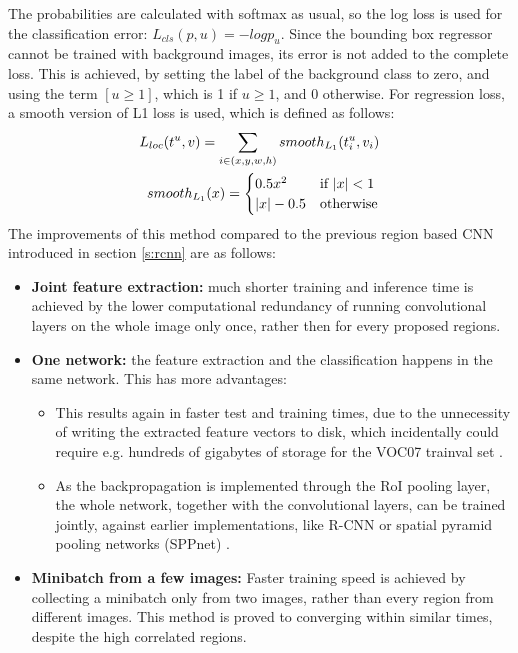 The probabilities are calculated with softmax as usual, so the log loss is used for the classification error: $L_{cls}(p,u) = -logp_u$. Since the bounding box regressor cannot be trained with background images, its error is not added to the complete loss. This is achieved, by setting the label of the background class to zero, and using the term $[u \ge 1]$, which is 1 if $u \ge 1$, and 0 otherwise. For regression loss, a smooth version of L1 loss is used, which is defined as follows:
\bigbreak
\begin{align}\label{eq:smoothl1loss}
	L_{loc}(t^u, v) = \sum\limits_{i \in (x, y, w, h)} smooth_{L_{1}} (t_{i}^u, v_i)\\
	smooth_{L_{1}} (x) = \begin{cases}
               0.5 x^2 & \text{if } \lvert x\rvert < 1\\
               \lvert x\rvert-0.5 & \text{otherwise}
            \end{cases}
\end{align}
\bigbreak
The improvements of this method compared to the previous region based CNN introduced in section \ref{s:rcnn} are as follows:
\begin{itemize}
	\item\textbf{Joint feature extraction:} much shorter training and inference time is achieved by the lower computational redundancy of running convolutional layers on the whole image only once, rather then for every proposed regions.
	\item\textbf{One network:} the feature extraction and the classification happens in the same network. This has more advantages:
	\begin{itemize}
	        \item This results again in faster test and training times, due to the unnecessity of writing the extracted feature vectors to disk, which incidentally could require e.g. hundreds of gigabytes of storage \cite{Girshick:2016:RCN:2881668.2882239} for the VOC07 trainval set \cite{pascal-voc-2007}.
	        \item As the backpropagation is implemented through the RoI pooling layer, the whole network, together with the convolutional layers, can be trained jointly, against earlier implementations, like R-CNN \cite{DBLP:journals/corr/GirshickDDM13} or spatial pyramid pooling networks (SPPnet) \cite{DBLP:journals/corr/HeZR014}.
	\end{itemize}
	\item\textbf{Minibatch from a few images:} Faster training speed is achieved by collecting a minibatch only from two images, rather than every region from different images. This method is proved to converging within similar times, despite the high correlated regions.
\end{itemize}
